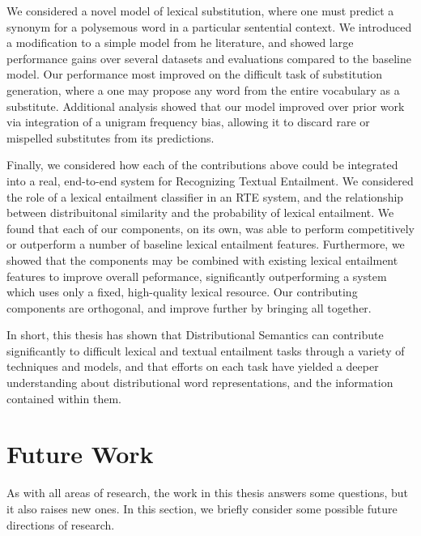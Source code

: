 We considered a novel model of lexical substitution, where one must predict
a synonym for a polysemous word in a particular sentential context. We introduced
a modification to a simple model from he literature, and showed
large performance gains over several datasets and evaluations compared to the
baseline model. Our performance most improved on the difficult task of
substitution generation, where a one may propose any word from the entire
vocabulary as a substitute. Additional analysis showed that our model improved
over prior work via integration of a unigram frequency bias, allowing
it to discard rare or mispelled substitutes from its predictions.

Finally, we considered how each of the contributions above could be integrated
into a real, end-to-end system for Recognizing Textual Entailment. We considered
the role of a lexical entailment classifier in an RTE system, and the
relationship between distribuitonal similarity and the probability of lexical
entailment. We found that each of our components, on its own, was able to
perform competitively or outperform a number of baseline lexical entailment
features. Furthermore, we showed that the components may be combined with
existing lexical entailment features to improve overall peformance,
significantly outperforming a system which uses only a fixed, high-quality
lexical resource. Our contributing components are orthogonal, and improve
further by bringing all together.

In short, this thesis has shown that Distributional Semantics can contribute
significantly to difficult lexical and textual entailment tasks through a
variety of techniques and models, and that efforts on each task have yielded
a deeper understanding about distributional word representations, and the
information contained within them.


\section{Future Work}

As with all areas of research, the work in this thesis answers some questions,
but it also raises new ones. In this section, we briefly consider some possible
future directions of research.

